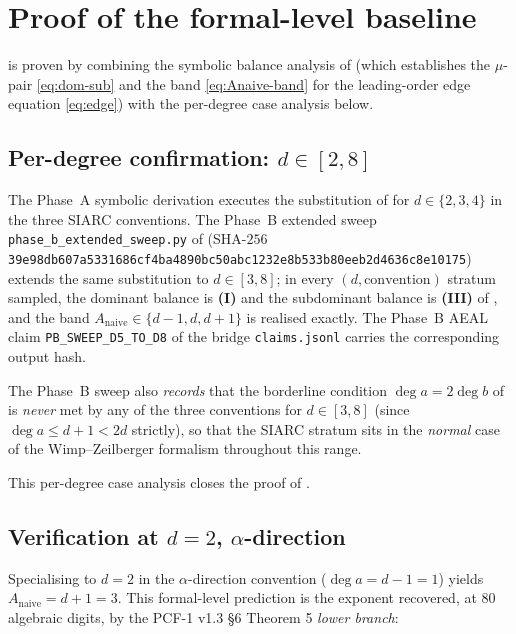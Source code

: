 \documentclass[11pt,reqno]{amsart}
\theoremstyle{plain}
\theoremstyle{definition}
\theoremstyle{remark}
\newcommand{\Anaive}{A_{\mathrm{naive}}}
\newcommand{\dega}{\deg a}
\newcommand{\degb}{\deg b}
\begin{document}
\section{Proof of the formal-level baseline}
\label{sec:proof}

 is proven by combining the symbolic balance
analysis of  (which establishes the
$\mu$-pair \eqref{eq:dom-sub} and the band
\eqref{eq:Anaive-band} for the leading-order edge equation
\eqref{eq:edge}) with the per-degree case analysis below.

\subsection{Per-degree confirmation: $d \in [2, 8]$}
\label{sec:proof-d28}
The Phase~A symbolic derivation
\cite[Phase~A.1--A.4]{siarc_t1_phase2} executes the substitution
of  for $d \in \{2, 3, 4\}$ in the three
SIARC conventions. The Phase~B extended sweep
\texttt{phase\_b\_extended\_sweep.py} of
\cite[Phase~B]{siarc_t1_phase2} (SHA-$256$
\texttt{39e98db607a5331686cf4ba4890bc50abc1232e8b533b80eeb2d4636c8e10175})
extends the same substitution to $d \in [3, 8]$; in every
$(d, \text{convention})$ stratum sampled, the dominant balance
is \textbf{(I)} and the subdominant balance is \textbf{(III)}
of , and the band
$\Anaive \in \{d-1, d, d+1\}$ is realised exactly. The Phase~B
AEAL claim \texttt{PB\_SWEEP\_D5\_TO\_D8} of the bridge
\texttt{claims.jsonl} carries the corresponding output hash.

The Phase~B sweep also \emph{records} that the borderline
condition $\dega = 2\degb$ of
\cite[\S5]{wimp1984computation} is \emph{never} met by any of
the three conventions for $d \in [3, 8]$ (since $\dega \le d+1 <
2d$ strictly), so that the SIARC stratum sits in the
\emph{normal} case of the Wimp--Zeilberger formalism throughout
this range.

This per-degree case analysis closes the proof of
.

\subsection{Verification at $d = 2$, $\alpha$-direction}
\label{sec:proof-d2}
Specialising  to $d = 2$ in the
$\alpha$-direction convention ($\dega = d - 1 = 1$) yields
$\Anaive = d + 1 = 3$. This formal-level prediction is the
exponent recovered, at $80$ algebraic digits, by the
PCF-1 v1.3 \S6 Theorem 5 \emph{lower branch}:
\end{document}
